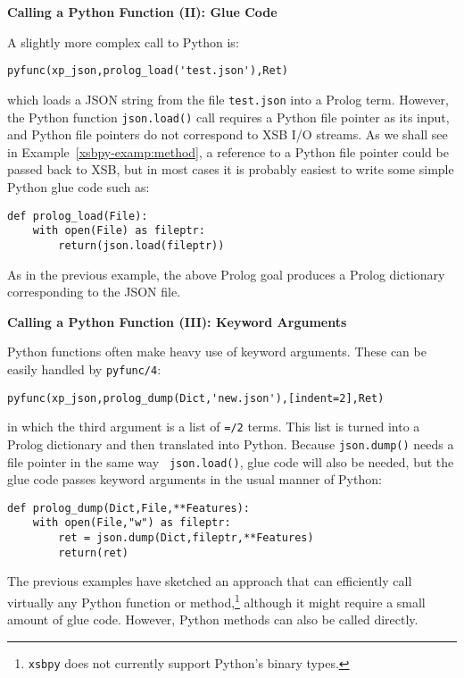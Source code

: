 \begin{example} \rm {\bf Calling a Python Function (II): Glue Code} \label{xsbpy-examp:glue}

\noindent
  A slightly more complex call to Python is:
 \begin{verbatim}
pyfunc(xp_json,prolog_load('test.json'),Ret)
\end{verbatim}

\noindent
which loads a JSON string from the file {\tt test.json} into a Prolog
term.  However, the Python function {\tt json.load()} call requires a
Python file pointer as its input, and Python file pointers do not
correspond to XSB I/O streams.  As we shall see in
Example~\ref{xsbpy-examp:method}, a reference to a Python file pointer
could be passed back to XSB, but in most cases it is probably easiest
to write some simple Python glue code such as:

\begin{verbatim}   
def prolog_load(File):
    with open(File) as fileptr:
        return(json.load(fileptr))
\end{verbatim}
\noindent
As in the previous example, the above Prolog goal produces a Prolog
dictionary corresponding to the JSON file.
\end{example}

\begin{example} \rm {\bf Calling a Python Function (III): Keyword Arguments}
  
\noindent
Python functions often make heavy use of keyword arguments.  These can
be easily handled by {\tt pyfunc/4}:
\begin{verbatim}
pyfunc(xp_json,prolog_dump(Dict,'new.json'),[indent=2],Ret)
\end{verbatim}

\noindent
in which the third argument is a list of {\tt =/2} terms.  This list
is turned into a Prolog dictionary and then translated into Python.
Because {\tt json.dump()} needs a file pointer in the same way {\tt
  json.load()}, glue code will also be needed, but the glue code passes
keyword arguments in the usual manner of Python:
\begin{verbatim}
def prolog_dump(Dict,File,**Features):
    with open(File,"w") as fileptr:
        ret = json.dump(Dict,fileptr,**Features)
        return(ret)
\end{verbatim}
\end{example}

The previous examples have sketched an approach that can efficiently
call virtually any Python function or method,\footnote{{\tt xsbpy}
  does not currently support Python's binary types.}  although it
might require a small amount of glue code.  However, Python methods can
also be called directly.

